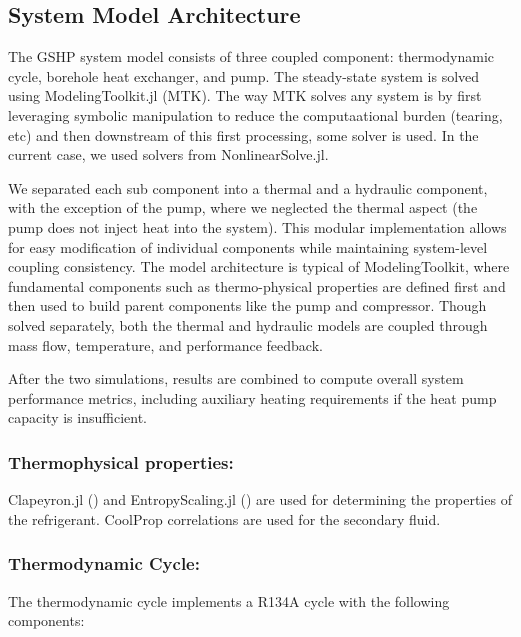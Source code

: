 \documentclass[journal=iecr,manuscript=]{achemso}
\begin{document}
\subsection{System Model Architecture}\label{system-model-architecture}

The GSHP system model consists of three coupled component: thermodynamic
cycle, borehole heat exchanger, and pump. The steady-state system is
solved using ModelingToolkit.jl (MTK). The way MTK solves any system is
by first leveraging symbolic manipulation to reduce the computaational
burden (tearing, etc) and then downstream of this first processing, some
solver is used. In the current case, we used solvers from
NonlinearSolve.jl.

We separated each sub component into a thermal and a hydraulic
component, with the exception of the pump, where we neglected the
thermal aspect (the pump does not inject heat into the system). This
modular implementation allows for easy modification of individual
components while maintaining system-level coupling consistency. The
model architecture is typical of ModelingToolkit, where fundamental
components such as thermo-physical properties are defined first and then
used to build parent components like the pump and compressor. Though
solved separately, both the thermal and hydraulic models are coupled
through mass flow, temperature, and performance feedback.

After the two simulations, results are combined to compute overall
system performance metrics, including auxiliary heating requirements if
the heat pump capacity is insufficient.

\subsubsection{Thermophysical
properties:}\label{thermophysical-properties}

Clapeyron.jl (\citet{andres_riedemann_clapeyronthermoclapeyronjl_2025})
and EntropyScaling.jl
(\citet{sebastian_schmitt_se-schmittentropyscalingjl_2025}) are used for
determining the properties of the refrigerant. CoolProp correlations are
used for the secondary fluid.

\subsubsection{Thermodynamic Cycle:}\label{thermodynamic-cycle}

The thermodynamic cycle implements a R134A cycle with the following
components:
\end{document}
